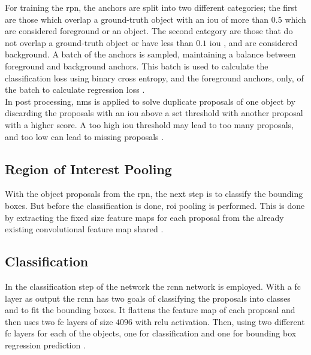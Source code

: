 For training the \gls{rpn}, the anchors are split into two different categories; the first are those which overlap a ground-truth object with an \gls{iou} of more than $0.5$ which are considered foreground or an object. The second category are those that do not overlap a ground-truth object or have less than $0.1$ \gls{iou} , and are considered background. 
A batch of the anchors is sampled, maintaining a balance between foreground and background anchors. This batch is used to calculate the classification loss using binary cross entropy, and the foreground anchors, only, of the batch to calculate regression loss \citep{Ren2017}.\\

In post processing, \gls{nms} is applied to solve duplicate proposals of one object by discarding the proposals with an \gls{iou} above a set threshold with another proposal with a higher score. A too high \gls{iou} threshold may lead to too many proposals, and too low can lead to missing proposals \citep{Ren2017}.

\subsection{Region of Interest Pooling}
With the object proposals from the \gls{rpn}, the next step is to classify the bounding boxes. But before the classification is done, \gls{roi} pooling is performed. This is done by extracting the fixed size feature maps for each proposal from the already existing convolutional feature map shared \citep{Ren2017}.

\subsection{Classification}
In the classification step of the network the \gls{rcnn} network is employed. With a \gls{fc} layer as output the \gls{rcnn} has two goals of classifying the proposals into classes and to fit the bounding boxes. It flattens the feature map of each proposal and then uses two \gls{fc} layers of size $4096$ with \gls{relu} activation. Then, using two different \gls{fc} layers for each of the objects, one for classification and one for bounding box regression prediction \citep{Ren2017}. 
